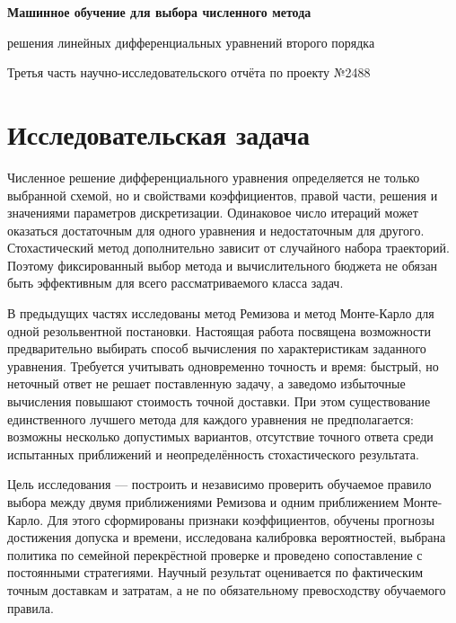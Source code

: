 
\begin{center}
{\Large\bfseries Машинное обучение для выбора численного метода\par}
{\large решения линейных дифференциальных уравнений второго порядка\par}
\vspace{3pt}
Третья часть научно-исследовательского отчёта по проекту №2488
\end{center}
\vspace{-4pt}
\section{Исследовательская задача}
Численное решение дифференциального уравнения определяется не только выбранной схемой, но и свойствами коэффициентов, правой части, решения и значениями параметров дискретизации. Одинаковое число итераций может оказаться достаточным для одного уравнения и недостаточным для другого. Стохастический метод дополнительно зависит от случайного набора траекторий. Поэтому фиксированный выбор метода и вычислительного бюджета не обязан быть эффективным для всего рассматриваемого класса задач.

В предыдущих частях исследованы метод Ремизова и метод Монте-Карло для одной резольвентной постановки. Настоящая работа посвящена возможности предварительно выбирать способ вычисления по характеристикам заданного уравнения. Требуется учитывать одновременно точность и время: быстрый, но неточный ответ не решает поставленную задачу, а заведомо избыточные вычисления повышают стоимость точной доставки. При этом существование единственного лучшего метода для каждого уравнения не предполагается: возможны несколько допустимых вариантов, отсутствие точного ответа среди испытанных приближений и неопределённость стохастического результата.

Цель исследования --- построить и независимо проверить обучаемое правило выбора между двумя приближениями Ремизова и одним приближением Монте-Карло. Для этого сформированы признаки коэффициентов, обучены прогнозы достижения допуска и времени, исследована калибровка вероятностей, выбрана политика по семейной перекрёстной проверке и проведено сопоставление с постоянными стратегиями. Научный результат оценивается по фактическим точным доставкам и затратам, а не по обязательному превосходству обучаемого правила.

